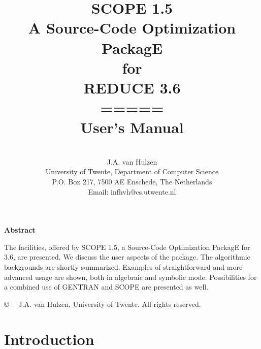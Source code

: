 \pagestyle{empty}
\makeindex
\title{{\bf SCOPE 1.5\\ A Source-Code Optimization PackagE\\ for\\ REDUCE 3.6\\
\vspace{0.5cm}
=====\\
\vspace{0.5cm} User's Manual}}
\date{}
\author {\large
 \vspace{1cm} \\
J.A. van Hulzen \\ University of Twente, Department of Computer Science\\
P.O. Box 217, 7500 AE Enschede, The Netherlands \\
Email: infhvh@cs.utwente.nl}
\newcommand{\ad}{\mbox{$\rightarrow$}\hspace{-.30cm}{$/$}\hspace{.30cm}}



\maketitle
\vspace{3cm}
\begin{center}
{\bf Abstract}\\
\end{center}

The facilities, offered by SCOPE 1.5, a Source-Code Optimization PackagE 
for {\REDUCE} 3.6, are presented. We discuss the user aspects of the package.
The algorithmic backgrounds are shortly summarized.
Examples of straightforward and more advanced usage are shown,  
both in algebraic and symbolic mode.
Possibilities for a combined use of GENTRAN and SCOPE are presented as well.

\vspace{1.5cm}
\copyright {\em \ \ } J.A. van Hulzen, University of Twente. All rights reserved.

\newpage
\tableofcontents
\newpage
\pagestyle{headings}
\section{Introduction}\label{SCOPE:intro}

